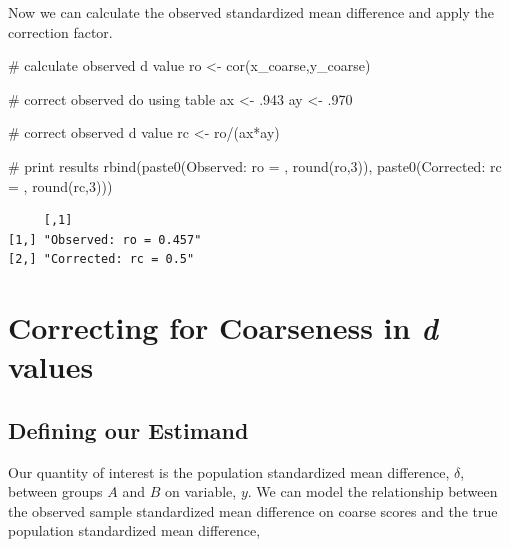 \documentclass[
  letterpaper,
  DIV=11,
  numbers=noendperiod]{scrreprt}
\newenvironment{Shaded}{\begin{snugshade}}{\end{snugshade}}
\newcommand{\CommentTok}[1]{\textcolor[rgb]{0.37,0.37,0.37}{#1}}
\newcommand{\DecValTok}[1]{\textcolor[rgb]{0.68,0.00,0.00}{#1}}
\newcommand{\FunctionTok}[1]{\textcolor[rgb]{0.28,0.35,0.67}{#1}}
\newcommand{\NormalTok}[1]{\textcolor[rgb]{0.00,0.23,0.31}{#1}}
\newcommand{\OtherTok}[1]{\textcolor[rgb]{0.00,0.23,0.31}{#1}}
\newcommand{\SpecialCharTok}[1]{\textcolor[rgb]{0.37,0.37,0.37}{#1}}
\newcommand{\StringTok}[1]{\textcolor[rgb]{0.13,0.47,0.30}{#1}}
\begin{document}
Now we can calculate the observed standardized mean difference and apply
the correction factor.

\begin{Shaded}
\begin{Highlighting}[]
\CommentTok{\# calculate observed d value}
\NormalTok{ro }\OtherTok{\textless{}{-}} \FunctionTok{cor}\NormalTok{(x\_coarse,y\_coarse)}

\CommentTok{\# correct observed do using table}
\NormalTok{ax }\OtherTok{\textless{}{-}}\NormalTok{ .}\DecValTok{943}
\NormalTok{ay }\OtherTok{\textless{}{-}}\NormalTok{ .}\DecValTok{970}

\CommentTok{\# correct observed d value}
\NormalTok{rc }\OtherTok{\textless{}{-}}\NormalTok{ ro}\SpecialCharTok{/}\NormalTok{(ax}\SpecialCharTok{*}\NormalTok{ay)}

\CommentTok{\# print results}
\FunctionTok{rbind}\NormalTok{(}\FunctionTok{paste0}\NormalTok{(}\StringTok{\textquotesingle{}Observed: ro = \textquotesingle{}}\NormalTok{, }\FunctionTok{round}\NormalTok{(ro,}\DecValTok{3}\NormalTok{)),}
      \FunctionTok{paste0}\NormalTok{(}\StringTok{\textquotesingle{}Corrected: rc = \textquotesingle{}}\NormalTok{, }\FunctionTok{round}\NormalTok{(rc,}\DecValTok{3}\NormalTok{)))}
\end{Highlighting}
\end{Shaded}

\begin{verbatim}
     [,1]                  
[1,] "Observed: ro = 0.457"
[2,] "Corrected: rc = 0.5" 
\end{verbatim}

\hypertarget{correcting-for-coarseness-in-d-values}{%
\section{\texorpdfstring{Correcting for Coarseness in \emph{d}
values}{Correcting for Coarseness in d values}}\label{correcting-for-coarseness-in-d-values}}

\hypertarget{defining-our-estimand-6}{%
\subsection{Defining our Estimand}\label{defining-our-estimand-6}}

Our quantity of interest is the population standardized mean difference,
\(\delta\), between groups \(A\) and \(B\) on variable, \(y\). We can
model the relationship between the observed sample standardized mean
difference on coarse scores and the true population standardized mean
difference,
\end{document}
